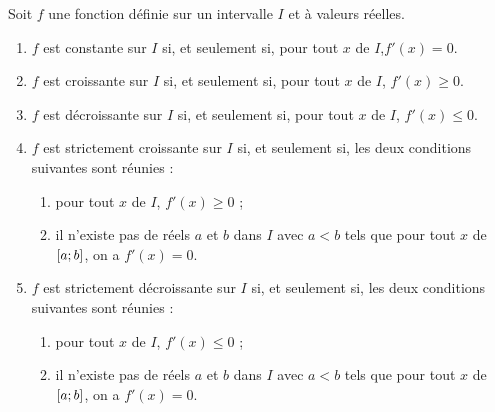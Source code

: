 \begin{defprop}
	Soit \(f\) une fonction définie sur un intervalle \(I\) et à valeurs réelles. \\
	\begin{enumerate}
		\item \(f\) est constante sur \(I\) si, et seulement si, pour tout \(x\) de \(I\),\(f'(x)=0\).
		\item \(f\) est croissante sur \(I\) si, et seulement si, pour tout \(x\) de \(I\), \(f'(x) \geq 0\).
		\item \(f\) est décroissante sur \(I\) si, et seulement si, pour tout \(x\) de \(I\), \(f'(x) \leq 0\).
		\item \(f\) est strictement croissante sur \(I\) si, et seulement si, les deux conditions suivantes sont réunies :
		      \begin{enumerate}
			      \item pour tout \(x\) de \(I\), \(f'(x) \geq 0\) ;
			      \item il n'existe pas de réels \(a\) et \(b\) dans \(I\) avec \(a < b\) tels que pour tout \(x\) de \(\left[a;b\right]\), on a \(f'(x) = 0\).
		      \end{enumerate}
		\item \(f\) est strictement décroissante sur \(I\) si, et seulement si, les deux conditions suivantes sont réunies :
		      \begin{enumerate}
			      \item pour tout \(x\) de \(I\), \(f'(x) \leq 0\) ;
			      \item il n'existe pas de réels \(a\) et \(b\) dans \(I\) avec \(a < b\) tels que pour tout \(x\) de \(\left[a;b\right]\), on a \(f'(x) = 0\).
		      \end{enumerate}
	\end{enumerate}
\end{defprop}

